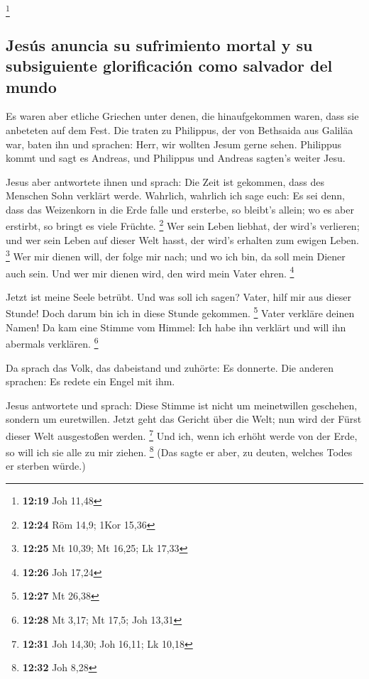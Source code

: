 \footnote{\textbf{12:19} Joh 11,48}

\hypertarget{jesuxfas-anuncia-su-sufrimiento-mortal-y-su-subsiguiente-glorificaciuxf3n-como-salvador-del-mundo}{%
\subsection{Jesús anuncia su sufrimiento mortal y su subsiguiente
glorificación como salvador del
mundo}\label{jesuxfas-anuncia-su-sufrimiento-mortal-y-su-subsiguiente-glorificaciuxf3n-como-salvador-del-mundo}}

 Es waren aber etliche Griechen unter denen, die
hinaufgekommen waren, dass sie anbeteten auf dem Fest. 
Die traten zu Philippus, der von Bethsaida aus Galiläa war, baten ihn
und sprachen: Herr, wir wollten Jesum gerne sehen. 
Philippus kommt und sagt es Andreas, und Philippus und Andreas sagten's
weiter Jesu.

 Jesus aber antwortete ihnen und sprach: Die Zeit ist
gekommen, dass des Menschen Sohn verklärt werde. 
Wahrlich, wahrlich ich sage euch: Es sei denn, dass das Weizenkorn in
die Erde falle und ersterbe, so bleibt's allein; wo es aber erstirbt, so
bringt es viele Früchte. \footnote{\textbf{12:24} Röm 14,9; 1Kor 15,36}
 Wer sein Leben liebhat, der wird's verlieren; und wer
sein Leben auf dieser Welt hasst, der wird's erhalten zum ewigen Leben.
\footnote{\textbf{12:25} Mt 10,39; Mt 16,25; Lk 17,33} 
Wer mir dienen will, der folge mir nach; und wo ich bin, da soll mein
Diener auch sein. Und wer mir dienen wird, den wird mein Vater ehren.
\footnote{\textbf{12:26} Joh 17,24}

 Jetzt ist meine Seele betrübt. Und was soll ich sagen?
Vater, hilf mir aus dieser Stunde! Doch darum bin ich in diese Stunde
gekommen. \footnote{\textbf{12:27} Mt 26,38}  Vater
verkläre deinen Namen! Da kam eine Stimme vom Himmel: Ich habe ihn
verklärt und will ihn abermals verklären. \footnote{\textbf{12:28} Mt
  3,17; Mt 17,5; Joh 13,31}

 Da sprach das Volk, das dabeistand und zuhörte: Es
donnerte. Die anderen sprachen: Es redete ein Engel mit ihm.

 Jesus antwortete und sprach: Diese Stimme ist nicht um
meinetwillen geschehen, sondern um euretwillen.  Jetzt
geht das Gericht über die Welt; nun wird der Fürst dieser Welt
ausgestoßen werden. \footnote{\textbf{12:31} Joh 14,30; Joh 16,11; Lk
  10,18}  Und ich, wenn ich erhöht werde von der Erde, so
will ich sie alle zu mir ziehen. \footnote{\textbf{12:32} Joh 8,28}
 (Das sagte er aber, zu deuten, welches Todes er sterben
würde.)

